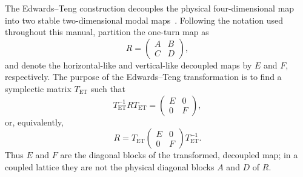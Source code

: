 The Edwards--Teng construction decouples the physical four-dimensional map
into two stable two-dimensional modal maps~\cite{EdwardsTeng,laurent_coupling_1,laurent_coupling_2}.
Following the notation used throughout this manual,
partition the one-turn map as
\begin{equation}
 R=\begin{pmatrix}A&B\\C&D\end{pmatrix},
\end{equation}
and denote the horizontal-like and vertical-like decoupled maps by $E$ and
$F$, respectively.  The purpose of the Edwards--Teng transformation is to
find a symplectic matrix $T_{\mathrm{ET}}$ such that
\begin{equation}
 T_{\mathrm{ET}}^{-1}RT_{\mathrm{ET}}
 =\begin{pmatrix}E&0\\0&F\end{pmatrix},
 \label{eq:et-decoupled-map}
\end{equation}
or, equivalently,
\begin{equation}
 R=T_{\mathrm{ET}}
 \begin{pmatrix}E&0\\0&F\end{pmatrix}
 T_{\mathrm{ET}}^{-1}.
 \label{eq:et-map-reconstruction}
\end{equation}
Thus $E$ and $F$ are the diagonal blocks of the transformed, decoupled map;
in a coupled lattice they are not the physical diagonal blocks $A$ and $D$ of
$R$.


